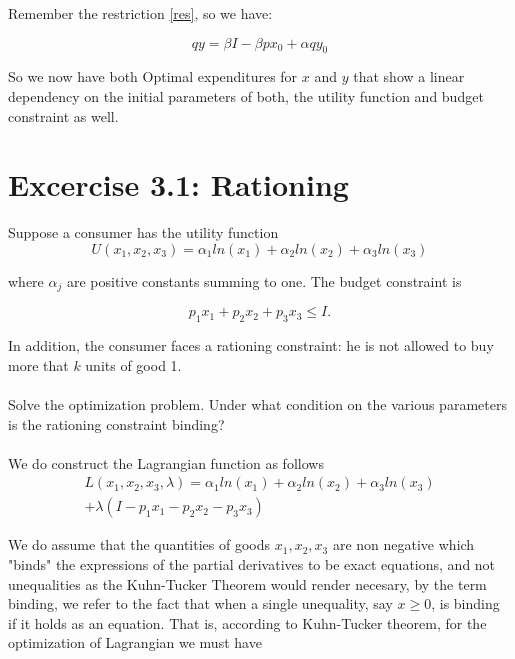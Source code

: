 \documentclass{article}
\begin{document}
\medskip

Remember the restriction \ref{res}, so we have:

\begin{equation}
  qy = \beta I - \beta px_0 + \alpha qy_0
\end{equation}

\medskip

So we now have both Optimal expenditures for $x$ and $y$ that show a linear dependency on the initial parameters of both, the utility function and budget constraint as well.

\bigskip

\section*{Excercise 3.1: Rationing}

\medskip

Suppose a consumer has the utility function
\begin{equation}\label{ut}
  U(x_1, x_2, x_3) = \alpha_1 ln(x_1) + \alpha_2 ln(x_2) +\alpha_3 ln(x_3)
\end{equation}

where $\alpha_j$ are positive constants summing to one. The budget constraint is

\begin{equation}
  p_1x_1 + p_2x_2 + p_3x_3 \leq I.
\end{equation}

In addition, the consumer faces a rationing constraint: he is not allowed to buy more that $k$ units of good 1.

\paragraph{}
Solve the optimization problem. Under what condition on the various parameters is the rationing constraint binding?

\paragraph{}
We do construct the Lagrangian function as follows
\begin{multline}
  L(x_1, x_2, x_3, \lambda) = \alpha_1 ln(x_1) + \alpha_2 ln(x_2) +\alpha_3 ln(x_3) \\ + \lambda (I - p_1x_1 - p_2x_2 - p_3x_3)
\end{multline}

We do assume that the quantities of goods $x_1, x_2, x_3$ are non negative which "binds" the expressions of the partial derivatives to be exact equations, and not unequalities as the Kuhn-Tucker Theorem would render necesary, by the term binding, we refer to the fact that when a single unequality, say $x \geq 0$, is binding if it holds as an equation. That is, according to Kuhn-Tucker theorem, for the optimization of Lagrangian we must have
\end{document}
